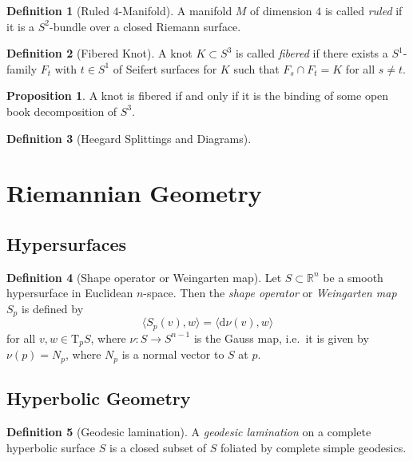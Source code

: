 \documentclass[a4paper]{article}
\newcommand{\RR}{\mathbb{R}}
\newcommand{\dd}{\mathrm{d}}
\newcommand{\lra}{\longrightarrow}
\newcommand{\ts}{\mathrm{T}}
\theoremstyle{definition}
\newtheorem{prop}{Proposition}
\theoremstyle{definition}
\newtheorem{definition}{Definition}
\theoremstyle{remark}
\theoremstyle{remark}
\theoremstyle{remark}
\begin{document}
\begin{definition}[Ruled $4$-Manifold]
  A manifold $M$ of dimension $4$ is called \emph{ruled} if it is a $S^2$-bundle over a closed Riemann surface.
\end{definition}

\begin{definition}[Fibered Knot]
  A knot $K\subset S^3$ is called \emph{fibered} if there exists a $S^1$-family $F_t$ with $t\in S^1$ of Seifert surfaces for $K$ such that $F_s\cap F_t=K$ for all $s\neq t$.
\end{definition}

\begin{prop}
  A knot is fibered if and only if it is the binding of some open book decomposition of $S^3$.
\end{prop}

\begin{definition}[Heegard Splittings and Diagrams]
  
\end{definition}

\section{Riemannian Geometry}

\subsection{Hypersurfaces}

\begin{definition}[Shape operator or Weingarten map]
  Let $S\subset\RR^n$ be a smooth hypersurface in Euclidean $n$-space. Then the \emph{shape operator} or \emph{Weingarten map} $S_p$ is defined by
  \begin{equation*}
    \langle S_p(v),w\rangle=\langle \dd\nu(v),w\rangle
  \end{equation*}
  for all $v,w\in\ts_pS$, where $\nu:S\lra S^{n-1}$ is the Gauss map, i.e.\ it is given by $\nu(p)=N_p$, where $N_p$ is a normal vector to $S$ at $p$.
\end{definition}

\subsection{Hyperbolic Geometry}

\begin{definition}[Geodesic lamination]
  A \emph{geodesic lamination} on a complete hyperbolic surface $S$ is a closed subset of $S$ foliated by complete simple geodesics.  
\end{definition}
\end{document}
